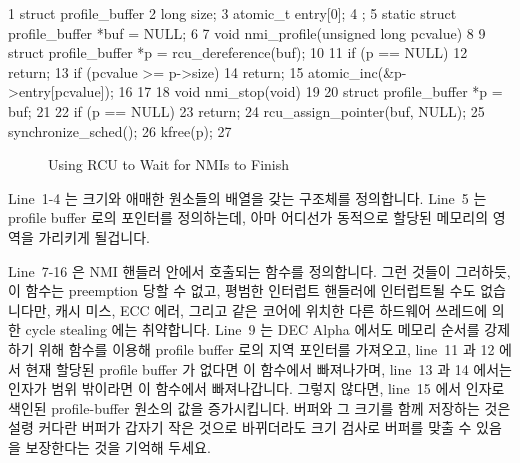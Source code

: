{ \scriptsize
\begin{verbbox}
  1 struct profile_buffer {
  2   long size;
  3   atomic_t entry[0];
  4 };
  5 static struct profile_buffer *buf = NULL;
  6
  7 void nmi_profile(unsigned long pcvalue)
  8 {
  9   struct profile_buffer *p = rcu_dereference(buf);
 10
 11   if (p == NULL)
 12     return;
 13   if (pcvalue >= p->size)
 14     return;
 15   atomic_inc(&p->entry[pcvalue]);
 16 }
 17
 18 void nmi_stop(void)
 19 {
 20   struct profile_buffer *p = buf;
 21
 22   if (p == NULL)
 23     return;
 24   rcu_assign_pointer(buf, NULL);
 25   synchronize_sched();
 26   kfree(p);
 27 }
\end{verbbox}
}
\begin{figure}[tbp]
\centering
\theverbbox
\caption{Using RCU to Wait for NMIs to Finish}
\label{fig:defer:Using RCU to Wait for NMIs to Finish}
\end{figure}

Line~1-4 는 크기와 애매한 원소들의 배열을 갖는  구조체를
정의합니다.
Line~5 는 profile buffer 로의 포인터를 정의하는데, 아마 어디선가 동적으로
할당된 메모리의 영역을 가리키게 될겁니다.

Line~7-16 은 NMI 핸들러 안에서 호출되는  함수를 정의합니다.
그런 것들이 그러하듯, 이 함수는 preemption 당할 수 없고, 평범한 인터럽트
핸들러에 인터럽트될 수도 없습니다만, 캐시 미스, ECC 에러, 그리고 같은 코어에
위치한 다른 하드웨어 쓰레드에 의한 cycle stealing 에는 취약합니다.
Line~9 는 DEC Alpha 에서도 메모리 순서를 강제하기 위해 
함수를 이용해 profile buffer 로의 지역 포인터를 가져오고, line~11 과 12 에서
현재 할당된 profile buffer 가 없다면 이 함수에서 빠져나가며, line~13 과 14
에서는  인자가 범위 밖이라면 이 함수에서 빠져나갑니다.
그렇지 않다면, line~15 에서   인자로 색인된 profile-buffer 원소의
값을 증가시킵니다.
버퍼와 그 크기를 함께 저장하는 것은 설령 커다란 버퍼가 갑자기 작은 것으로
바뀌더라도 크기 검사로 버퍼를 맞출 수 있음을 보장한다는 것을 기억해 두세요.

